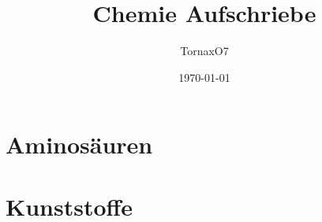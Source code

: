 \documentclass[a4paper, 12pt]{scrartcl}
\title{Chemie Aufschriebe}
\author{TornaxO7}
\date{\today}
\begin{document}
\maketitle
\tableofcontents
\section{Aminosäuren}

\section{Kunststoffe}





%
\end{document}
